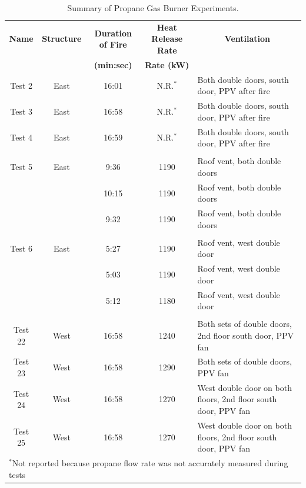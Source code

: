 \renewcommand{\baselinestretch}{1}
\begin{table}
\begin{center}
\caption{Summary of Propane Gas Burner Experiments.}
\begin{tabular}{ccccl}
\toprule
\textbf{Name}  	& 	\textbf{Structure} 	& 	\textbf{Duration of Fire} 	& 	\textbf{Heat Release Rate} 	& 	\multicolumn{1}{c}{\textbf{Ventilation}}	\\ 
				& 						& 		\textbf{(min:sec)} 		& 	\textbf{Rate (kW)}			& 													\\
\midrule
Test 2 			& 	East 				&  		16:01 					& 	N.R.$^*$ 					& 	Both double doors, south door, PPV after fire	\\
Test 3			& 	East 				&  		16:58 					&   N.R.$^*$   					& 	Both double doors, south door, PPV after fire					\\
Test 4			& 	East 				&  		16:59 					&  	N.R.$^*$ 					& 	Both double doors, south door, PPV after fire					\\
\multicolumn{5}{c}{} \\
Test 5 			& 	East 				&  		 9:36 					&  		1190 					& 	Roof vent, both double doors				 					\\
				& 						& 		10:15 					&  		1190 					& 	Roof vent, both double doors				 					\\
				& 						& 		 9:32 					&  		1190 					& 	Roof vent, both double doors				 					\\				
\multicolumn{5}{c}{} \\
Test 6			&	East 				&  		 5:27 					&  		1190 					& 	Roof vent, west double door					 	    			\\
				& 						& 		 5:03 					&  		1190 					& 	Roof vent, west double door					 	    			\\
				& 						& 		 5:12 					&  		1180 					& 	Roof vent, west double door					 	    			\\
\multicolumn{5}{c}{} \\
Test 22			&	West 				&  		16:58 					&  		1240 					& 	Both sets of double doors, 2nd floor south door, PPV fan 		\\
Test 23			&	West 				&  		16:58 					&  		1290 					& 	Both sets of double doors, PPV fan						 		\\
Test 24			&	West 				&  		16:58 					&  		1270 					&   West double door on both floors, 2nd floor south door, PPV fan 	\\
Test 25			&	West 				&  		16:58 					&  		1270 					& 	West double door on both floors, 2nd floor south door, PPV fan 	\\
\bottomrule
\multicolumn{5}{l}{$^*$\footnotesize{Not reported because propane flow rate was not accurately measured during tests}}
\end{tabular}
\end{center}
\label{table:exp_summary}
\end{table}
\clearpage

